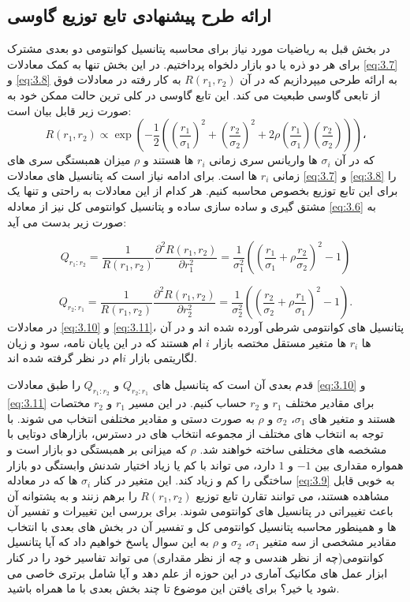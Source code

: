 \documentclass[a4paper,titlepage,12pt,fleqn,oneside]{report}
\begin{document}
\subsection{ارائه طرح پیشنهادی تابع توزیع گاوسی}
در بخش قبل به ریاضیات مورد نیاز برای محاسبه پتانسیل کوانتومی دو بعدی مشترک برای هر دو ذره یا دو بازار دلخواه پرداختیم. در این بخش تنها به کمک معادلات
\ref{eq:3.7}
و
\ref{eq:3.8}
به ارائه طرحی میپردازیم که در آن 
$R(r_1,r_2)$
به کار رفته در معادلات فوق از تابعی گاوسی طبعیت می کند. این  تابع گاوسی در کلی ترین حالت ممکن خود به صورت زیر قابل بیان است:
\begin{equation}
R(r_1,r_2) \propto \exp\left( -\frac{1}{2} \left( (\frac{r_1}{\sigma_1})^2 + (\frac{r_2}{\sigma_2})^2 +2\rho(\frac{r_1}{\sigma_1})(\frac{r_2}{\sigma_2})\right)\right)،
\label{eq:3.9}
\end{equation}
که در آن 
$\sigma_i$
ها واریانس سری زمانی 
$r_i$
ها هستند و 
$\rho$
میزان همبستگی سری های زمانی 
$r_i$
ها است.
برای ادامه نیاز است که پتانسیل های معادلات 
\ref{eq:3.7}
و
\ref{eq:3.8}
را برای این تابع توزیع بخصوص محاسبه کنیم.
هر کدام از این معادلات به راحتی و تنها یک مشتق گیری و ساده سازی ساده و پتانسیل کوانتومی کل نیز از معادله 
\ref{eq:3.6}
به صورت زیر بدست می آید:

\begin{equation}
Q_{r_1:r_2} = \frac{1}{R(r_1,r_2)} \frac{\partial^2 R(r_1,r_2)}{\partial r_1^2} = \frac{1}{\sigma_1^2}\left(\left(\frac{r_1}{\sigma_1} + \rho\frac{r_2}{\sigma_2}\right)^2-1\right)
\label{eq:3.10}
\end{equation}

\begin{equation}
Q_{r_2:r_1}  = \frac{1}{R(r_1,r_2)}\frac{\partial^2 R(r_1,r_2)}{\partial r_2^2}  = \frac{1}{\sigma_2^2}\left(\left(\frac{r_2}{\sigma_2} + \rho\frac{r_1}{\sigma_1}\right)^2-1\right).
\label{eq:3.11}
\end{equation}
در معادلات 
\ref{eq:3.10}
و
\ref{eq:3.11}،
پتانسیل های کوانتومی شرطی آورده شده اند و در آن ها 
$r_i$
ها متغیر مستقل مختصه بازار $i$ ام هستند که در این پایان نامه، سود و زیان لگاریتمی بازار $i$ام در نظر گرفته شده اند.

قدم بعدی آن است که پتانسیل های 
$Q_{r_2:r_1}$
و
$Q_{r_1:r_2}$
را طبق معادلات 
\ref{eq:3.10}
و
\ref{eq:3.11}
برای مقادیر مختلف 
$r_1$
و
$r_2$
حساب کنیم. در این مسیر 
$r_1$
و
$r_2$
مختصات هستند و متغیر های 
$\sigma_1$،
$\sigma_2$
و
$\rho$
به صورت دستی و مقادیر مختلفی انتخاب می شوند. با توجه به انتخاب های مختلف از مجموعه انتخاب های در دسترس،  بازارهای دوتایی با مشخصه های مختلفی ساخته خواهند شد. 
$\rho$
که میزانی بر همبستگی دو بازار است و همواره مقداری بین 
$-1$
و 
$1$
دارد، می تواند با کم یا زیاد اختیار شدنش وابستگی دو بازار ساختگی را کم و زیاد کند. 
این متغیر در کنار 
$\sigma_i$
ها که در معادله 
\ref{eq:3.9}
به خوبی قابل مشاهده هستند، می توانند تقارن تابع توزیع
$R(r_1,r_2)$
را برهم زنند و به پشتوانه آن باعث تغییراتی در پتانسیل های کوانتومی شوند. برای بررسی این تغییرات و تفسیر آن ها و همینطور محاسبه پتانسیل کوانتومی کل و تفسیر آن در بخش های بعدی با انتخاب مقادیر مشخصی از سه متغیر
$\sigma_1$،
$\sigma_2$
و
$\rho$
به این سوال پاسخ خواهیم داد که آیا پتانسیل کوانتومی(چه از نظر هندسی و چه از نظر مقداری) می تواند تفاسیر خود را در کنار ابزار عمل های مکانیک آماری در این حوزه از علم دهد و آیا شامل برتری خاصی می شود یا خیر؟ برای یافتن این موضوع تا چند بخش بعدی با ما همراه باشید.
\end{document}
